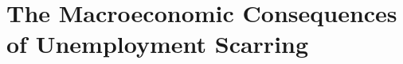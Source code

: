 \chapter[The Macroeconomic Consequences of Unemployment Scarring]{The Macroeconomic Consequences of Unemployment Scarring\raisebox{.3\baselineskip}{\normalsize\footnotemark}}
